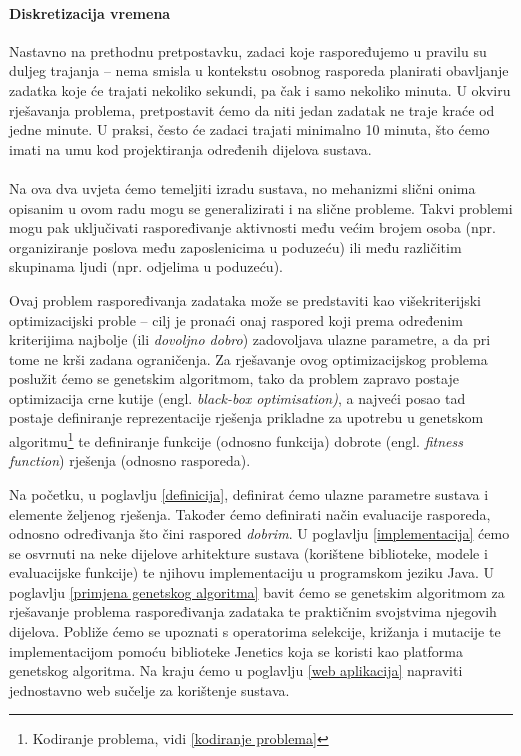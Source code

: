 \documentclass[times, utf8, zavrsni]{fer}
\begin{document}
\paragraph{Diskretizacija vremena} Nastavno na prethodnu pretpostavku, zadaci koje raspoređujemo u pravilu su duljeg trajanja -- nema smisla u kontekstu osobnog rasporeda planirati obavljanje zadatka koje će trajati nekoliko sekundi, pa čak i samo nekoliko minuta. U okviru rješavanja problema, pretpostavit ćemo da niti jedan zadatak ne traje kraće od jedne minute. U praksi, često će zadaci trajati minimalno 10 minuta, što ćemo imati na umu kod projektiranja određenih dijelova sustava.

\paragraph{}

Na ova dva uvjeta ćemo temeljiti izradu sustava, no mehanizmi slični onima opisanim u ovom radu mogu se generalizirati i na slične probleme. Takvi problemi mogu pak uključivati raspoređivanje aktivnosti među većim brojem osoba (npr. organiziranje poslova među zaposlenicima u poduzeću) ili među različitim skupinama ljudi (npr. odjelima u poduzeću).

Ovaj problem raspoređivanja zadataka može se predstaviti kao višekriterijski optimizacijski proble -- cilj je pronaći onaj raspored koji prema određenim kriterijima najbolje (ili \textit{dovoljno dobro}) zadovoljava ulazne parametre, a da pri tome ne krši zadana ograničenja. Za rješavanje ovog optimizacijskog problema poslužit ćemo se genetskim algoritmom, tako da problem zapravo postaje optimizacija crne kutije (engl. \textit{black-box optimisation)}, a najveći posao tad postaje definiranje reprezentacije rješenja prikladne za upotrebu u genetskom algoritmu\footnote{Kodiranje problema, vidi \ref{kodiranje problema}} te definiranje funkcije (odnosno funkcija) dobrote (engl. \textit{fitness function}) rješenja (odnosno rasporeda).

Na početku, u poglavlju \ref{definicija}, definirat ćemo ulazne parametre sustava i elemente željenog rješenja. Također ćemo definirati način evaluacije rasporeda, odnosno određivanja što čini raspored \textit{dobrim}. U poglavlju \ref{implementacija} ćemo se osvrnuti na neke dijelove arhitekture sustava (korištene biblioteke, modele i evaluacijske funkcije) te njihovu implementaciju u programskom jeziku Java. U poglavlju \ref{primjena genetskog algoritma} bavit ćemo se genetskim algoritmom za rješavanje problema raspoređivanja zadataka te praktičnim svojstvima njegovih dijelova. Pobliže ćemo se upoznati s operatorima selekcije, križanja i mutacije te implementacijom pomoću biblioteke Jenetics koja se koristi kao platforma genetskog algoritma. Na kraju ćemo u poglavlju \ref{web aplikacija} napraviti jednostavno web sučelje za korištenje sustava.%
\end{document}
